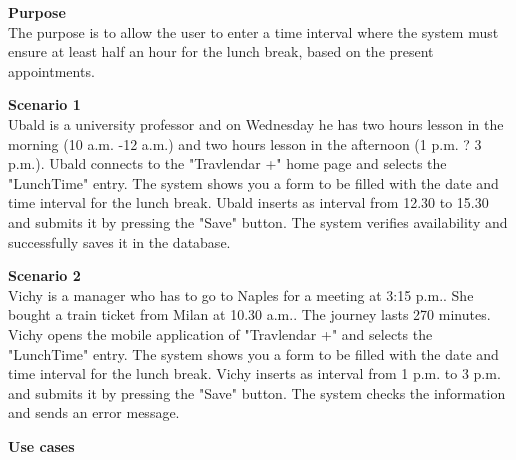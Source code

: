 \documentclass{article}
\begin{document}
	\bigskip
	\noindent
	\textbf{Purpose} \\
	The purpose is to allow the user to enter a time interval where the system must ensure at least half an hour for the lunch break, based on the present appointments.
	
	\bigskip
	\noindent
	\textbf{Scenario 1} \\
	Ubald is a university professor and on Wednesday he has two hours lesson in the morning (10 a.m. -12 a.m.) and two hours lesson in the afternoon (1 p.m. ? 3 p.m.). Ubald connects to the "Travlendar +" home page and selects the "LunchTime" entry. The system shows you a form to be filled with the date and time interval for the lunch break. Ubald inserts as interval from 12.30 to 15.30 and submits it by pressing the "Save" button. The system verifies availability and successfully saves it in the database.
	
	\bigskip
	\noindent
	\textbf{Scenario 2} \\
	Vichy is a manager who has to go to Naples for a meeting at 3:15 p.m.. She bought a train ticket from Milan at 10.30 a.m.. The journey lasts 270 minutes. Vichy opens the mobile application of "Travlendar +" and selects the "LunchTime" entry. The system shows you a form to be filled with the date and time interval for the lunch break. Vichy inserts as interval from 1 p.m. to 3 p.m. and submits it by pressing the "Save" button. The system checks the information and sends an error message.
	
	\bigskip
	\noindent
	\textbf{Use cases} \\
	
\end{document}
